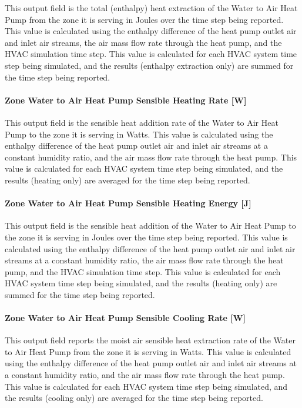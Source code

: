 This output field is the total (enthalpy) heat extraction of the Water to Air Heat Pump from the zone it is serving in Joules over the time step being reported. This value is calculated using the enthalpy difference of the heat pump outlet air and inlet air streams, the air mass flow rate through the heat pump, and the HVAC simulation time step. This value is calculated for each HVAC system time step being simulated, and the results (enthalpy extraction only) are summed for the time step being reported.

\paragraph{Zone Water to Air Heat Pump Sensible Heating Rate {[}W{]}}\label{zone-water-to-air-heat-pump-sensible-heating-rate-w}

This output field is the sensible heat addition rate of the Water to Air Heat Pump to the zone it is serving in Watts. This value is calculated using the enthalpy difference of the heat pump outlet air and inlet air streams at a constant humidity ratio, and the air mass flow rate through the heat pump. This value is calculated for each HVAC system time step being simulated, and the results (heating only) are averaged for the time step being reported.

\paragraph{Zone Water to Air Heat Pump Sensible Heating Energy {[}J{]}}\label{zone-water-to-air-heat-pump-sensible-heating-energy-j}

This output field is the sensible heat addition of the Water to Air Heat Pump to the zone it is serving in Joules over the time step being reported. This value is calculated using the enthalpy difference of the heat pump outlet air and inlet air streams at a constant humidity ratio, the air mass flow rate through the heat pump, and the HVAC simulation time step. This value is calculated for each HVAC system time step being simulated, and the results (heating only) are summed for the time step being reported.

\paragraph{Zone Water to Air Heat Pump Sensible Cooling Rate {[}W{]}}\label{zone-water-to-air-heat-pump-sensible-cooling-rate-w}

This output field reports the moist air sensible heat extraction rate of the Water to Air Heat Pump from the zone it is serving in Watts. This value is calculated using the enthalpy difference of the heat pump outlet air and inlet air streams at a constant humidity ratio, and the air mass flow rate through the heat pump. This value is calculated for each HVAC system time step being simulated, and the results (cooling only) are averaged for the time step being reported.

